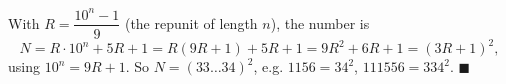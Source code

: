 With $R=\dfrac{10^n-1}9$ (the repunit of length $n$), the number is
\[N=R\cdot10^n+5R+1=R(9R+1)+5R+1=9R^2+6R+1=(3R+1)^2,\]
using $10^n=9R+1$. So $N=(33\ldots34)^2$, e.g. $1156=34^2$, $111556=334^2$. $\blacksquare$
